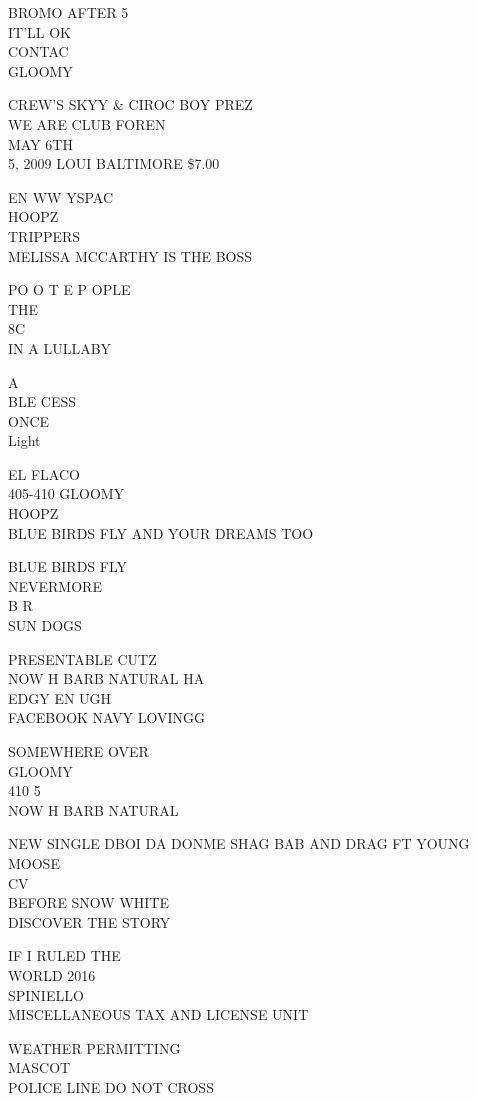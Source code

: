 \documentclass[10pt,letterpaper]{article}
\begin{document}
BROMO AFTER 5\\
IT'LL OK\\
CONTAC\\
GLOOMY

CREW'S SKYY \& CIROC BOY PREZ\\
WE ARE CLUB FOREN\\
MAY 6TH\\
5, 2009 LOUI BALTIMORE \$7.00

EN WW YSPAC\\
HOOPZ\\
TRIPPERS\\
MELISSA MCCARTHY IS THE BOSS

PO O T E P OPLE\\
THE\\
8C\\
IN A LULLABY

A\\
BLE CESS\\
ONCE\\
Light

EL FLACO\\
405{-}410 GLOOMY\\
HOOPZ\\
BLUE BIRDS FLY AND YOUR DREAMS TOO

BLUE BIRDS FLY\\
NEVERMORE\\
B R\\
SUN DOGS

PRESENTABLE CUTZ\\
NOW H BARB NATURAL HA\\
EDGY EN UGH\\
FACEBOOK NAVY LOVINGG

SOMEWHERE OVER\\
GLOOMY\\
410 5\\
NOW H BARB NATURAL

NEW SINGLE DBOI DA DONME SHAG BAB AND DRAG FT YOUNG MOOSE\\
CV\\
BEFORE SNOW WHITE\\
DISCOVER THE STORY

IF I RULED THE\\
WORLD 2016\\
SPINIELLO\\
MISCELLANEOUS TAX AND LICENSE UNIT

WEATHER PERMITTING\\
MASCOT\\
POLICE LINE DO NOT CROSS
\end{document}
